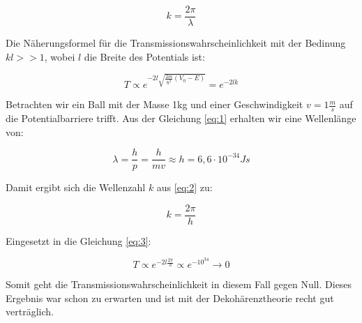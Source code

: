 \begin{equation} 
\label{eq:2}
k=\frac{2\pi}{\lambda}
\end{equation}

Die Näherungsformel für die Transmissionswahrscheinlichkeit mit der Bedinung \( kl>>1 \), wobei \(l\) die Breite des Potentials ist:

\begin{equation} 
\label{eq:3}
T\propto e^{-2l\sqrt{\frac{2m}{\hbar^2}(V_0-E)}} = e^{-2lk} 
\end{equation}

Betrachten wir ein Ball mit der Masse 1kg und einer Geschwindigkeit \(v=1\frac{m}{s}\) auf die Potentialbarriere trifft. Aus der Gleichung \eqref{eq:1} erhalten wir eine Wellenlänge von:

\begin{equation}
  \label{eq:4}
  \lambda = \frac{h}{p} = \frac{h}{mv} \approx h=6,6\cdot 10^{-34} Js
\end{equation}

Damit ergibt sich die Wellenzahl \(k\) aus \eqref{eq:2} zu:

\begin{equation}
  \label{eq:5}
  k=\frac{2\pi}{h}
\end{equation}

Eingesetzt in die Gleichung \eqref{eq:3}:

\begin{equation} 
\label{eq:6}
T\propto e^{-2l\frac{2\pi}{h} }\propto e^{-10^{34}}\rightarrow 0 
\end{equation}


Somit geht die Transmissionswahrscheinlichkeit in diesem Fall gegen Null. Dieses Ergebnis war schon zu erwarten und ist mit der Dekohärenztheorie recht gut verträglich.






